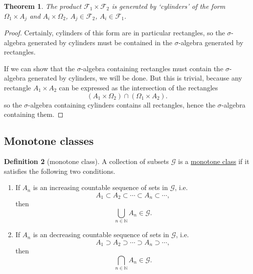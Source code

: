 \documentclass[a4paper,12pt]{scrreprt}
\newcommand{\N}{\mathbb{N}}
\newcommand{\defn}[1]{\ul{#1}}
\theoremstyle{definition}
\newtheorem{definition}{Definition}
\theoremstyle{plain}
\newtheorem{theorem}[definition]{Theorem}
\theoremstyle{remark}
\begin{document}
\begin{theorem}
  The product $\mathcal{F}_{1} \times \mathcal{F}_{2}$ is generated by `cylinders' of the form $\Omega_{1} \times A_{j}$ and $A_{i} \times \Omega_{2}$, $A_{j} \in \mathcal{F}_{2}$, $A_{i} \in \mathcal{F}_{1}$.
\end{theorem}
\begin{proof}
  Certainly, cylinders of this form are in particular rectangles, so the $\sigma$-algebra generated by cylinders must be contained in the $\sigma$-algebra generated by rectangles.

  If we can show that the $\sigma$-algebra containing rectangles must contain the $\sigma$-algebra generated by cylinders, we will be done. But this is trivial, because any rectangle $A_{1} \times A_{2}$ can be expressed as the intersection of the rectangles
  \begin{equation*}
    (A_{1} \times \Omega_{2}) \cap (\Omega_{1} \times A_{2}).
  \end{equation*}
  so the $\sigma$-algebra containing cylinders contains all rectangles, hence the $\sigma$-algebra containing them.
\end{proof}

\subsection{Monotone classes}

\begin{definition}[monotone class]
  \label{def:monotoneclass}
  A collection of subsets $\mathcal{G}$ is a \defn{monotone class} if it satisfies the following two conditions.
  \begin{enumerate}
    \item If $A_{n}$ is an increasing countable sequence of sets in $\mathcal{G}$, i.e.\
      \begin{equation*}
        A_{1} \subset A_{2} \subset \cdots \subset A_{n} \subset \cdots,
      \end{equation*}
      then
      \begin{equation*}
        \bigcup_{n \in \N} A_{n} \in \mathcal{G}.
      \end{equation*}

    \item If $A_{n}$ is an decreasing countable sequence of sets in $\mathcal{G}$, i.e.\
      \begin{equation*}
        A_{1} \supset A_{2} \supset \cdots \supset A_{n} \supset \cdots,
      \end{equation*}
      then
      \begin{equation*}
        \bigcap_{n \in \N} A_{n} \in \mathcal{G}.
      \end{equation*}
  \end{enumerate}
\end{definition}
\end{document}
